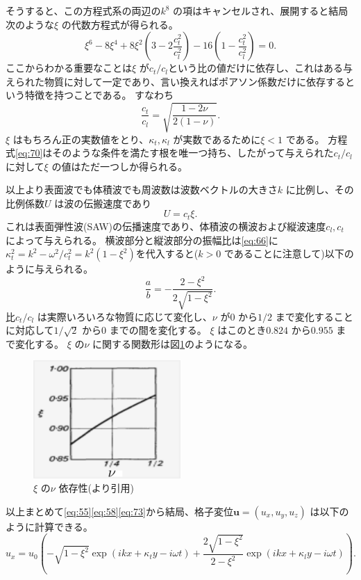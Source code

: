 \documentclass[dvipdfmx]{jsreport}
\numberwithin{equation}{chapter}
\numberwithin{table}{chapter}
\begin{document}
そうすると、この方程式系の両辺の$k^{8}$ の項はキャンセルされ、展開すると結局次のような$\xi$ の代数方程式が得られる。
\begin{equation}
\label{eq:70}
	\xi^{6}-8\xi^{4}+8\xi^2\left( 3-2 \frac{c_t^2}{c_l^2} \right) -16\left( 1- \frac{c_t^2}{c_l^2} \right) =0
.\end{equation}
ここからわかる重要なことは$\xi$ が$c_t /c_l$という比の値だけに依存し、これはある与えられた物質に対して一定であり、言い換えればポアソン係数だけに依存するという特徴を持つことである。
すなわち
\begin{equation}
\label{eq:71}
	\frac{c_t}{c_l}=\sqrt{\frac{1-2\nu}{2(1-\nu)}} 
.\end{equation}
$\xi$ はもちろん正の実数値をとり、$\kappa_t,\kappa_l$ が実数であるために$\xi<1$ である。
方程式\eqref{eq:70}はそのような条件を満たす根を唯一つ持ち、したがって与えられた$c_t /c_l$ に対して$\xi$ の値はただ一つしか得られる。

以上より表面波でも体積波でも周波数は波数ベクトルの大きさ$k$ に比例し、その比例係数$U$ は波の伝搬速度であり
\begin{equation}
\label{eq:72}
	U=c_t\xi
.\end{equation}
これは表面弾性波(SAW)の伝播速度であり、体積波の横波および縦波速度$c_l,c_t$ によって与えられる。
横波部分と縦波部分の振幅比は\eqref{eq:66}に$\kappa_t^2=k^2-\omega^2 /c_t^2=k^2(1-\xi^2)$を代入すると($k>0$ であることに注意して)以下のように与えられる。
\begin{equation}
\label{eq:73}
	\frac{a}{b}=-\frac{2-\xi^2}{2\sqrt{1-\xi^2} }
.\end{equation}
比$c_t /c_l$ は実際いろいろな物質に応じて変化し、$\nu$ が$0$ から$1 /2$ まで変化することに対応して$1 /\sqrt{2} $ から$0$ までの間を変化する。
$\xi$ はこのとき$0.824$ から$0.955$ まで変化する\cite{landau}。
$\xi$ の$\nu$ に関する関数形は図\ref{fig:fig-nu_xi-png}のようになる。
\begin{figure}[H]
	\centering
	\includegraphics[width=0.5\textwidth]{fig/nu_xi.png}
	\caption{$\xi$ の$\nu$ 依存性(\cite{landau}より引用)}
	\label{fig:fig-nu_xi-png}
\end{figure}
以上まとめて\eqref{eq:55}\eqref{eq:58}\eqref{eq:73}から結局、格子変位$\bm{u}=(u_x,u_y,u_z)$ は以下のように計算できる。
\begin{equation}
\label{eq:74}
	u_x=u_0\left( -\sqrt{1-\xi^2} \exp (ikx+\kappa_t y-i\omega t)+\frac{2\sqrt{1-\xi^2} }{2-\xi^2}\exp (ikx + \kappa_l y -i\omega t) \right) 
.\end{equation}
\end{document}
